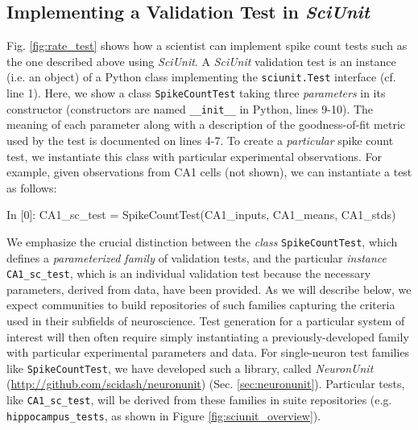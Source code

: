 \documentclass{frontiersSCNS}
\let\verbx\lstinline
\begin{document}
\subsection{Implementing a Validation Test in \textit{SciUnit}}
Fig. \ref{fig:rate_test} shows how a scientist can implement spike count tests such as the one described above using \textit{SciUnit}. 
A \textit{SciUnit} validation test is an {instance} (i.e. an object) of a Python class implementing the \verbx{sciunit.Test} interface (cf. line 1). 
Here, we show a class \verbx{SpikeCountTest} taking three \emph{parameters} in its constructor (constructors are named \verbx{__init__} in Python, lines 9-10). 
The meaning of each parameter along with a description of the goodness-of-fit metric used by the test is documented on lines 4-7. 
To create a \emph{particular} spike count test, we instantiate this class with particular experimental observations. 
For example, given observations from CA1 cells (not shown), we can instantiate a test as follows:
\begin{ipy}
  In [0]: CA1_sc_test = SpikeCountTest(CA1_inputs, CA1_means, CA1_stds)
\end{ipy}
We emphasize the crucial distinction between the \textit{class} \verbx{SpikeCountTest}, which defines a \emph{parameterized family} of validation tests, and the particular \textit{instance} \verbx{CA1_sc_test}, which is an individual validation test because the necessary parameters, derived from data, have been provided. 
As we will describe below, we expect communities to build repositories of such families capturing the criteria used in their subfields of neuroscience. 
Test generation for a particular system of interest will then often require simply instantiating a previously-developed family with particular experimental parameters and data. 
For single-neuron test families like \verbx{SpikeCountTest}, we have developed such a library, called \textit{NeuronUnit} (\url{http://github.com/scidash/neuronunit}) (Sec. \ref{sec:neuronunit}). 
Particular tests, like \verbx{CA1_sc_test}, will be derived from these families in suite repositories (e.g. \verbx{hippocampus_tests}, as shown in Figure \ref{fig:sciunit_overview}).
\end{document}
